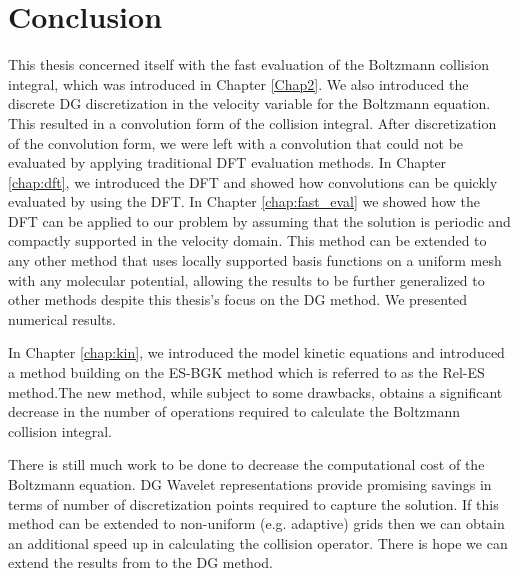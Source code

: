 \documentclass[12pt]{CSUNthesis}
\begin{document}
\chapter{Conclusion}
This thesis concerned itself with the fast evaluation of the Boltzmann collision integral, which was introduced in Chapter \ref{Chap2}. 
We also introduced the discrete DG discretization in the velocity variable for the Boltzmann equation. 
This resulted in a convolution form of the collision integral. After discretization of the convolution form, we were left with a convolution that could not be evaluated by applying traditional DFT evaluation methods. 
In Chapter \ref{chap:dft}, we introduced the DFT and showed how convolutions can be quickly evaluated by using the DFT. In Chapter \ref{chap:fast_eval} we showed how the DFT can be applied to our problem by assuming that the solution is periodic and compactly supported in the velocity domain. 
This method can be extended to any other method that uses locally supported basis functions on a uniform mesh with any molecular potential, allowing the results to be further generalized to other methods despite this thesis's focus on the DG method.
We presented numerical results. 

In Chapter \ref{chap:kin}, we introduced the model kinetic equations and introduced a method building on the ES-BGK method which is referred to as the Rel-ES method.The new method, while subject to some drawbacks, obtains a significant decrease in the number of operations required to calculate the Boltzmann collision integral. 

There is still much work to be done to decrease the computational cost of the Boltzmann equation. DG Wavelet representations provide promising savings in terms of number of discretization points required to capture the solution. If this method can be extended to non-uniform (e.g. adaptive) grids then we can obtain an additional speed up in calculating the collision operator. There is hope we can extend the results from \cite{GambaHaakHauckHu2017} to the DG method.


\clearpage
{}


\end{document}
